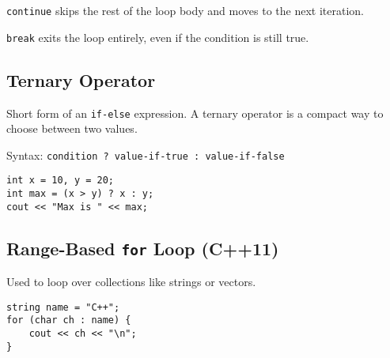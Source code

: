 \documentclass{article}
\begin{document}
\texttt{continue} skips the rest of the loop body and moves to the next iteration.

\texttt{break} exits the loop entirely, even if the condition is still true.

\subsection{Ternary Operator}

Short form of an \texttt{if-else} expression. A ternary operator is a compact way to choose between two values.

Syntax: \texttt{condition ? value-if-true : value-if-false}

\begin{lstlisting}[style=cppstyle]
int x = 10, y = 20;
int max = (x > y) ? x : y;
cout << "Max is " << max;
\end{lstlisting}

\subsection{Range-Based \texttt{for} Loop (C++11)}

Used to loop over collections like strings or vectors.

\begin{lstlisting}[style=cppstyle]
string name = "C++";
for (char ch : name) {
    cout << ch << "\n";
}
\end{lstlisting}
\end{document}

